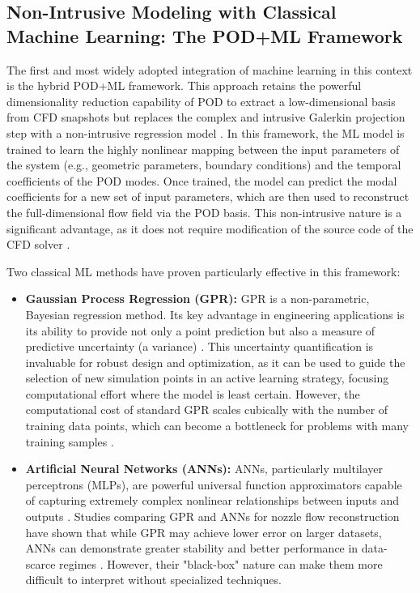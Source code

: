 \documentclass[dsc, EN]{ufabcFHZh}
\begin{document}
\subsection{Non-Intrusive Modeling with Classical Machine Learning: The POD+ML Framework}

The first and most widely adopted integration of machine learning in this context is the hybrid POD+ML framework. This approach retains the powerful dimensionality reduction capability of POD to extract a low-dimensional basis from CFD snapshots but replaces the complex and intrusive Galerkin projection step with a non-intrusive regression model \citep{synthesized2024}. In this framework, the ML model is trained to learn the highly nonlinear mapping between the input parameters of the system (e.g., geometric parameters, boundary conditions) and the temporal coefficients of the POD modes. Once trained, the model can predict the modal coefficients for a new set of input parameters, which are then used to reconstruct the full-dimensional flow field via the POD basis. This non-intrusive nature is a significant advantage, as it does not require modification of the source code of the CFD solver \citep{synthesized2024}.

Two classical ML methods have proven particularly effective in this framework:
\begin{itemize}
    \item \textbf{Gaussian Process Regression (GPR):} GPR is a non-parametric, Bayesian regression method. Its key advantage in engineering applications is its ability to provide not only a point prediction but also a measure of predictive uncertainty (a variance) \citep{synthesized2024}. This uncertainty quantification is invaluable for robust design and optimization, as it can be used to guide the selection of new simulation points in an active learning strategy, focusing computational effort where the model is least certain. However, the computational cost of standard GPR scales cubically with the number of training data points, which can become a bottleneck for problems with many training samples \citep{synthesized2024}.
    \item \textbf{Artificial Neural Networks (ANNs):} ANNs, particularly multilayer perceptrons (MLPs), are powerful universal function approximators capable of capturing extremely complex nonlinear relationships between inputs and outputs \citep{synthesized2024}. Studies comparing GPR and ANNs for nozzle flow reconstruction have shown that while GPR may achieve lower error on larger datasets, ANNs can demonstrate greater stability and better performance in data-scarce regimes \citep{synthesized2024}. However, their "black-box" nature can make them more difficult to interpret without specialized techniques.
\end{itemize}
\end{document}
